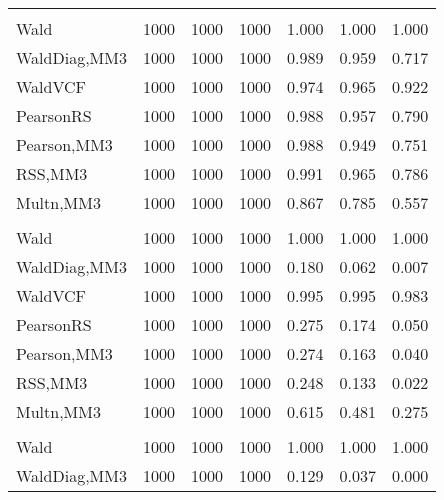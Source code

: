 \documentclass[
]{article}
\begin{document}
\begin{table}[H]
{\begin{tabular}[t]{lrrrrrr}
\addlinespace[0.3em]
\multicolumn{7}{l}{\textbf{1F 15V}}\\
\hspace{1em}Wald & 1000 & 1000 & 1000 & 1.000 & 1.000 & \vphantom{2} 1.000\\
\hspace{1em}WaldDiag,MM3 & 1000 & 1000 & 1000 & 0.989 & 0.959 & 0.717\\
\hspace{1em}WaldVCF & 1000 & 1000 & 1000 & 0.974 & 0.965 & 0.922\\
\hspace{1em}PearsonRS & 1000 & 1000 & 1000 & 0.988 & 0.957 & 0.790\\
\hspace{1em}Pearson,MM3 & 1000 & 1000 & 1000 & 0.988 & 0.949 & 0.751\\
\hspace{1em}RSS,MM3 & 1000 & 1000 & 1000 & 0.991 & 0.965 & 0.786\\
\hspace{1em}Multn,MM3 & 1000 & 1000 & 1000 & 0.867 & 0.785 & 0.557\\
\addlinespace[0.3em]
\multicolumn{7}{l}{\textbf{2F 10V}}\\
\hspace{1em}Wald & 1000 & 1000 & 1000 & 1.000 & 1.000 & \vphantom{1} 1.000\\
\hspace{1em}WaldDiag,MM3 & 1000 & 1000 & 1000 & 0.180 & 0.062 & 0.007\\
\hspace{1em}WaldVCF & 1000 & 1000 & 1000 & 0.995 & 0.995 & 0.983\\
\hspace{1em}PearsonRS & 1000 & 1000 & 1000 & 0.275 & 0.174 & 0.050\\
\hspace{1em}Pearson,MM3 & 1000 & 1000 & 1000 & 0.274 & 0.163 & 0.040\\
\hspace{1em}RSS,MM3 & 1000 & 1000 & 1000 & 0.248 & 0.133 & 0.022\\
\hspace{1em}Multn,MM3 & 1000 & 1000 & 1000 & 0.615 & 0.481 & 0.275\\
\addlinespace[0.3em]
\multicolumn{7}{l}{\textbf{3F 15V}}\\
\hspace{1em}Wald & 1000 & 1000 & 1000 & 1.000 & 1.000 & 1.000\\
\hspace{1em}WaldDiag,MM3 & 1000 & 1000 & 1000 & 0.129 & 0.037 & 0.000\\

\end{tabular}}
\end{table}
\end{document}
